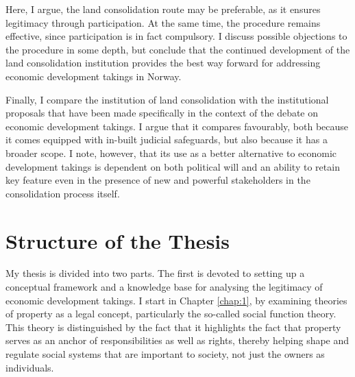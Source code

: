 \documentclass{article} %
\newcommand{\noo}[1]{}
\begin{document}
Here, I argue, the land consolidation route may be preferable, as it ensures legitimacy through participation. At the same time, the procedure remains effective, since participation is in fact compulsory. I discuss possible objections to the procedure in some depth, but conclude that the continued development of the land consolidation institution provides the best way forward for addressing economic development takings in Norway.

Finally, I compare the institution of land consolidation with the institutional proposals that have been made specifically in the context of the debate on economic development takings. I argue that it compares favourably, both because it comes equipped with in-built judicial safeguards, but also because it has a broader scope. I note, however, that its use as a better alternative to economic development takings is dependent on both political will and an ability to retain key feature even in the presence of new and powerful stakeholders in the consolidation process itself.

\noo{ In the second part of the thesis, I put the theoretical framework to the test by applying it to a concrete case study, namely that of Norwegian hydropower. Following liberalisation of the energy sector in the early 1990s, hydropower is now a commercial pursuit in Norway. Moreover, there is a long tradition for granting energy producers the power to acquire property compulsorily, including the necessary rights to exploit the energy of water, rights that are subject to private property under Norwegian law. This has resulted in tension and controversy, however, as the original owners of these rights, typically local farmers and small-holders, see the commercial potential of hydropower being transferred to other commercial interests, to the detriment of their own, and their communities', interest in self-governance and economic benefit.}

\section{Structure of the Thesis}

My thesis is divided into two parts. The first is devoted to setting up a conceptual framework and a knowledge base for analysing the legitimacy of economic development takings. I start in Chapter \ref{chap:1}, by examining theories of property as a legal concept, particularly the so-called social function theory. This theory is distinguished by the fact that it highlights the fact that property serves as an anchor of responsibilities as well as rights, thereby helping shape and regulate social systems that are important to society, not just the owners as individuals.
\end{document}
